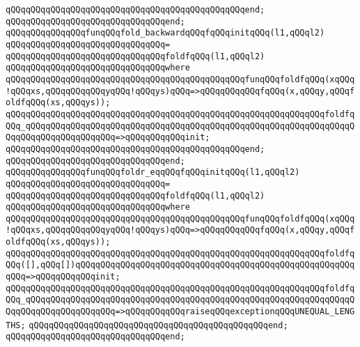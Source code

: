 \verb|qQQqqQQqqQQqqQQqqQQqqQQqqQQqqQQqqQQqqQQqqQQqqQQqend;|\newline
\verb|qQQqqQQqqQQqqQQqqQQqqQQqqQQqqQQqend;|\newline
\newline
\verb|qQQqqQQqqQQqqQQqfunqQQqfold_backwardqQQqfqQQqinitqQQq(l1,qQQql2)|\newline
\verb|qQQqqQQqqQQqqQQqqQQqqQQqqQQqqQQq=|\newline
\verb|qQQqqQQqqQQqqQQqqQQqqQQqqQQqqQQqfoldfqQQq(l1,qQQql2)|\newline
\verb|qQQqqQQqqQQqqQQqqQQqqQQqqQQqqQQqwhere|\newline
\verb|qQQqqQQqqQQqqQQqqQQqqQQqqQQqqQQqqQQqqQQqqQQqqQQqfunqQQqfoldfqQQq(xqQQq!qQQqxs,qQQqqQQqqQQqyqQQq!qQQqys)qQQq=>qQQqqQQqqQQqfqQQq(x,qQQqy,qQQqfoldfqQQq(xs,qQQqys));|\newline
\verb|qQQqqQQqqQQqqQQqqQQqqQQqqQQqqQQqqQQqqQQqqQQqqQQqqQQqqQQqqQQqqQQqfoldfqQQq_qQQqqQQqqQQqqQQqqQQqqQQqqQQqqQQqqQQqqQQqqQQqqQQqqQQqqQQqqQQqqQQqqQQqqQQqqQQqqQQqqQQqqQQq=>qQQqqQQqqQQqinit;|\newline
\verb|qQQqqQQqqQQqqQQqqQQqqQQqqQQqqQQqqQQqqQQqqQQqqQQqend;|\newline
\verb|qQQqqQQqqQQqqQQqqQQqqQQqqQQqqQQqend;|\newline
\newline
\verb|qQQqqQQqqQQqqQQqfunqQQqfoldr_eqqQQqfqQQqinitqQQq(l1,qQQql2)|\newline
\verb|qQQqqQQqqQQqqQQqqQQqqQQqqQQqqQQq=|\newline
\verb|qQQqqQQqqQQqqQQqqQQqqQQqqQQqqQQqfoldfqQQq(l1,qQQql2)|\newline
\verb|qQQqqQQqqQQqqQQqqQQqqQQqqQQqqQQqwhere|\newline
\verb|qQQqqQQqqQQqqQQqqQQqqQQqqQQqqQQqqQQqqQQqqQQqqQQqfunqQQqfoldfqQQq(xqQQq!qQQqxs,qQQqqQQqqQQqyqQQq!qQQqys)qQQq=>qQQqqQQqqQQqfqQQq(x,qQQqy,qQQqfoldfqQQq(xs,qQQqys));|\newline
\verb|qQQqqQQqqQQqqQQqqQQqqQQqqQQqqQQqqQQqqQQqqQQqqQQqqQQqqQQqqQQqqQQqfoldfqQQq([],qQQq[])qQQqqQQqqQQqqQQqqQQqqQQqqQQqqQQqqQQqqQQqqQQqqQQqqQQqqQQqqQQq=>qQQqqQQqqQQqinit;|\newline
\verb|qQQqqQQqqQQqqQQqqQQqqQQqqQQqqQQqqQQqqQQqqQQqqQQqqQQqqQQqqQQqqQQqfoldfqQQq_qQQqqQQqqQQqqQQqqQQqqQQqqQQqqQQqqQQqqQQqqQQqqQQqqQQqqQQqqQQqqQQqqQQqqQQqqQQqqQQqqQQqqQQq=>qQQqqQQqqQQqraiseqQQqexceptionqQQqUNEQUAL_LENGTHS;|\newline
\verb|qQQqqQQqqQQqqQQqqQQqqQQqqQQqqQQqqQQqqQQqqQQqqQQqend;|\newline
\verb|qQQqqQQqqQQqqQQqqQQqqQQqqQQqqQQqend;|\newline

